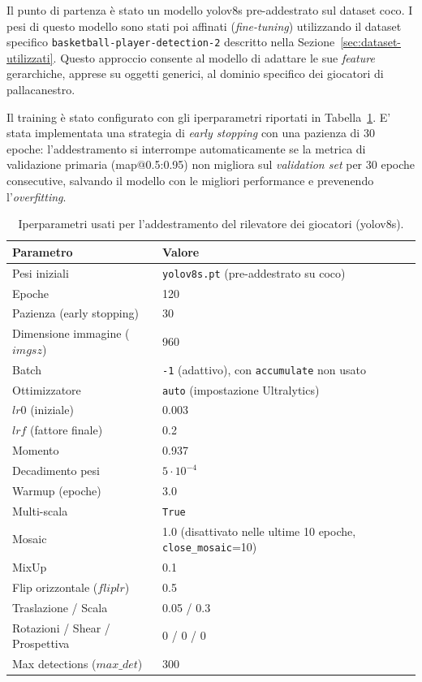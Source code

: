 \documentclass[12pt,a4paper,openright,twoside]{book}
\begin{document}
Il punto di partenza è stato un modello \ac{yolo}v8s pre-addestrato 
sul dataset \ac{coco}. I pesi di questo modello sono stati poi affinati 
(\emph{fine-tuning}) utilizzando il dataset specifico 
\texttt{basketball-player-detection-2} descritto nella Sezione~\ref{sec:dataset-utilizzati}. 
Questo approccio consente al modello di adattare le sue \emph{feature} 
gerarchiche, apprese su oggetti generici, al dominio specifico dei 
giocatori di pallacanestro.

Il training è stato configurato con gli iperparametri riportati in 
Tabella~\ref{tab:hyperparams_player_det}. E' stata implementata una 
strategia di \emph{early stopping} con una pazienza di 30 epoche: 
l'addestramento si interrompe automaticamente se la metrica di 
validazione primaria (\ac{map}@0.5:0.95) non migliora sul 
\emph{validation set} per 30 epoche consecutive, salvando il modello 
con le migliori performance e prevenendo l'\emph{overfitting}.

\begin{table}[h]
  \centering
  \caption{Iperparametri usati per l'addestramento del rilevatore 
  dei giocatori (\ac{yolo}v8s).}
  \label{tab:hyperparams_player_det}
  \begin{tabular}{l l}
    \toprule
    \textbf{Parametro} & \textbf{Valore} \\
    \midrule
    Pesi iniziali & \texttt{yolov8s.pt} (pre-addestrato su \ac{coco}) \\
    Epoche & 120 \\
    Pazienza (early stopping) & 30 \\
    Dimensione immagine ($imgsz$) & 960 \\
    Batch & \texttt{-1} (adattivo), con \texttt{accumulate} non usato \\
    Ottimizzatore & \texttt{auto} (impostazione Ultralytics) \\
    $lr0$ (iniziale) & 0.003 \\
    $lrf$ (fattore finale) & 0.2 \\
    Momento & 0.937 \\
    Decadimento pesi & $5\cdot10^{-4}$ \\
    Warmup (epoche) & 3.0 \\
    Multi-scala & \texttt{True} \\
    Mosaic & 1.0 (disattivato nelle ultime 10 epoche, \texttt{close\_mosaic}=10) \\
    MixUp & 0.1 \\
    Flip orizzontale ($fliplr$) & 0.5 \\
    Traslazione / Scala & 0.05 / 0.3 \\
    Rotazioni / Shear / Prospettiva & 0 / 0 / 0 \\
    Max detections ($max\_det$) & 300 \\
    \bottomrule
  \end{tabular}
\end{table}
\end{document}
